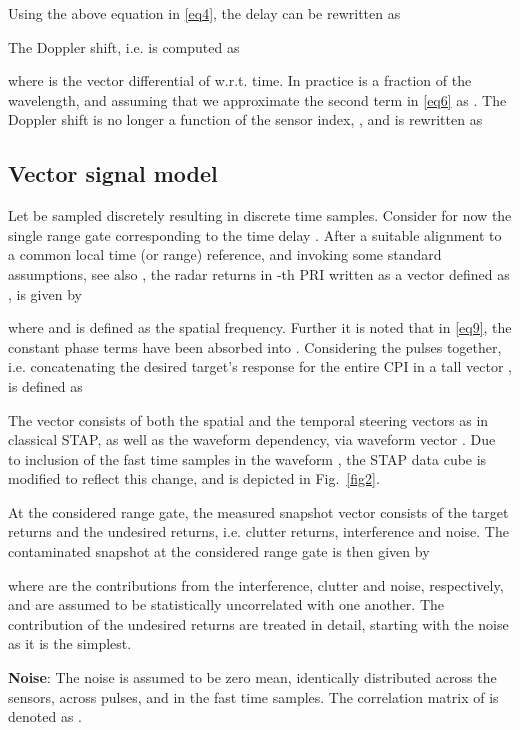 \documentclass[11pt,draftclsnofoot,onecolumn]{IEEEtran}
\theoremstyle{definition}
\theoremstyle{remark}
\begin{document}
Using the above equation in \eqref{eq4}, the delay  can be rewritten as

The Doppler shift, i.e.  is computed as

where  is the vector differential of  w.r.t. time. In practice  is a fraction of the wavelength, and assuming that  we approximate the second term in \eqref{eq6} as . The Doppler shift is no longer a function of the sensor index, , and is rewritten as




\subsection{Vector signal model}
Let  be sampled discretely resulting in  discrete time samples. Consider for now the single range gate corresponding to the time delay . After a suitable alignment to a common local time (or range) reference,  and invoking some standard assumptions, see also \cite[{\it A.1-A.3}] {Setlurradar2013}, the radar returns in -th PRI  written as a vector defined as , is given by

where  and  is defined as the spatial frequency. Further it is noted that in \eqref{eq9}, the constant phase terms have been absorbed into . Considering the  pulses together, i.e. concatenating the desired target's response for the entire CPI in a tall vector , is defined as

The vector  consists of both the spatial and the temporal steering vectors as in classical STAP, as well as the waveform dependency, via waveform vector . Due to inclusion of the fast time samples in the waveform , the STAP data cube is modified to reflect this change, and is depicted in Fig.~\ref{fig2}.

At the considered range gate, the measured snapshot vector consists of the target returns and the undesired returns, i.e. clutter returns, interference and noise. The contaminated snapshot at the considered range gate is then given by

where  are the contributions from the interference, clutter and noise, respectively, and are assumed to be statistically uncorrelated with one another. The contribution of the undesired returns are treated in detail, starting with the noise as it is the simplest.

{\bf Noise}: The noise is assumed to be zero mean, identically distributed across the sensors, across pulses, and  in the fast time samples. The correlation matrix of  is denoted as . 
\end{document}
